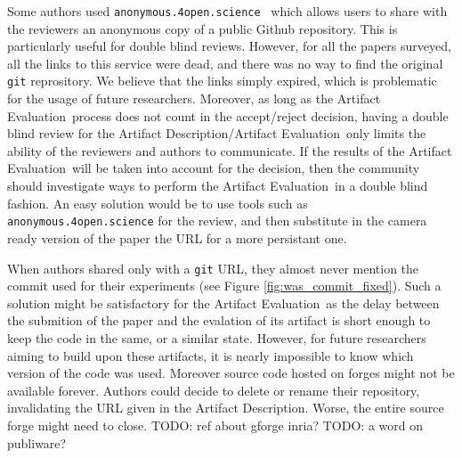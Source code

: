 \documentclass[sigconf]{acmart}
\newcommand{\ad}{Artifact Description}
\newcommand{\aeval}{Artifact Evaluation}
\newcommand{\adae}{\ad/\aeval}
\newcommand{\todo}[1]{{\color{red}TODO: #1}}
\begin{document}
Some authors used \texttt{anonymous.4open.science}\ \cite{anonymous_github} which allows users to share with the reviewers an anonymous copy of a public Github repository.
This is particularly useful for double blind reviews.
However, for all the papers surveyed, all the links to this service were dead, and there was no way to find the original \texttt{git} reprository.
We believe that the links simply expired, which is problematic for the usage of future researchers.
Moreover, as long as the \aeval\ process does not count in the accept/reject decision, having a double blind review for the \adae\ only limits the ability of the reviewers and authors to communicate.
If the results of the \aeval\ will be taken into account for the decision, then the community should investigate ways to perform the \aeval\ in a double blind fashion.
An easy solution would be to use tools such as \texttt{anonymous.4open.science} for the review, and then substitute in the camera ready version of the paper the URL for a more persistant one.

When authors shared only with a \texttt{git} URL, they almost never mention the commit used for their experiments (see Figure \ref{fig:was_commit_fixed}).
Such a solution might be satisfactory for the \aeval\ as the delay between the submition of the paper and the evalation of its artifact is short enough to keep the code in the same, or a similar state.
However, for future researchers aiming to build upon these artifacts, it is nearly impossible to know which version of the code was used.
Moreover source code hosted on forges might not be available forever.
Authors could decide to delete or rename their repository, invalidating the URL given in the \ad.
Worse, the entire source forge might need to close. \todo{ref about gforge inria?}
\todo{a word on publiware?}
\end{document}

